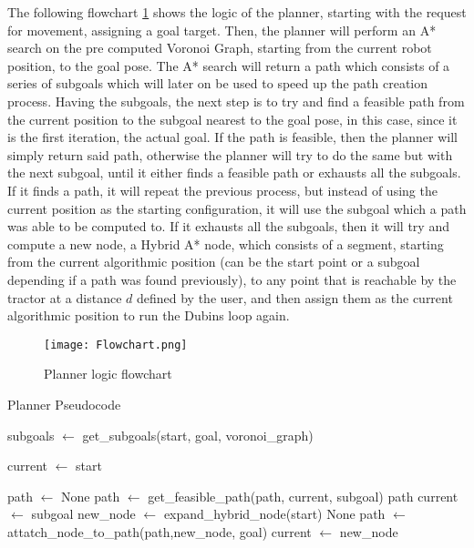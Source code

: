 The following flowchart \ref{fig:plannerfc} shows the logic of the planner, starting with 
the request for movement, assigning a goal target. Then, the planner will 
perform an A* search on the pre computed Voronoi Graph, starting from the current robot 
position, to the goal pose. The A* search will return a path which consists 
of a series of subgoals which will later on be used to speed up the 
path creation process. Having the subgoals, the next step is to try and 
find a feasible path from the current position to the subgoal nearest to 
the goal pose, in this case, since it is the first iteration, the actual goal. 
If the path is feasible, then the planner will simply return said path, otherwise
 the planner will try to do the same but with the next subgoal, until it either finds 
a feasible path or exhausts all the subgoals. If it finds a path, it will 
repeat the previous process, but instead of using the current position as the 
starting configuration, it will use the subgoal which a path was able to be 
computed to. If it exhausts all the subgoals, then it will try and compute a new node, 
a Hybrid A* node, which consists of a segment, starting from the current algorithmic position 
(can be the start point or a subgoal depending if a path was found previously), to any point 
that is reachable by the tractor at a distance $d$ defined by the user, and then assign them as the 
current algorithmic position to run the Dubins loop again.
\begin{figure}[h]
    \centering
    \texttt{[image: Flowchart.png]}
    \caption{Planner logic flowchart}
    \label{fig:plannerfc}
\end{figure}
\clearpage

\begin{algorithm}
\caption{Planner Pseudocode}
\label{alg:planner}
\begin{algorithmic}[1]
    \State subgoals $\gets$ get\_subgoals(start, goal, voronoi\_graph)

    \State current $\gets$ start

    \State path $\gets$ None
        \State path $\gets$ get\_feasible\_path(path, current, subgoal)
                \State \Return path
            \Else
                \State current $\gets$ subgoal
            \EndIf
        \EndIf
    \EndFor
        \State new\_node $\gets$ expand\_hybrid\_node(start)
            \State \Return None
        \EndIf
        \State path $\gets$ attatch\_node\_to\_path(path,new\_node, goal)
        \State current $\gets$ new\_node
    \EndWhile
\EndFunction
\end{algorithmic}
\end{algorithm}

